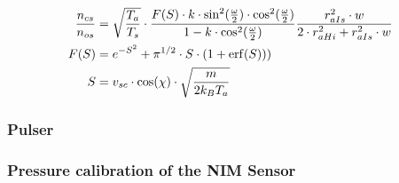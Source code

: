 		\begin{align*}
			\frac{n_{cs}}{n_{os}} &= \sqrt{\frac{T_a}{T_s}}\cdot\frac{F(S)\cdot k\cdot \sin^2(\frac{\omega}{2})\cdot \cos^2(\frac{\omega}{2})}{1-k\cdot \cos^2(\frac{\omega}{2})}\frac{r_{aIs}^2\cdot w}{2\cdot r_{aHi}^2 + r_{aIs}^2\cdot w}\\
			F(S) &= e^{-S^2} + \pi^{1/2}\cdot S\cdot(1 + {\rm erf}(S)))\\
			S &= v_{sc}\cdot \cos(\chi)\cdot \sqrt{\frac{m}{2k_B T_a}}
		\end{align*}
		
		
		
		
		\subsubsection{Pulser}
		
		\subsubsection{Pressure calibration of the NIM Sensor}
		
